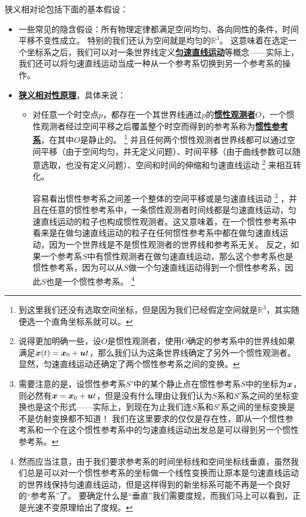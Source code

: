 \documentclass[hyperref, UTF8, a4paper]{ctexart}
\newcommand*{\concept}[1]{\underline{\textbf{#1}}}
\begin{document}
狭义相对论包括下面的基本假设：
\begin{itemize}
    \item 一些常见的隐含假设：所有物理定律都满足空间均匀、各向同性的条件，时间平移不变性成立。
    特别的我们还认为空间就是均匀的$\mathbb{R}^3$。
    这意味着在选定一个坐标系之后，我们可以对一条世界线定义\concept{匀速直线运动}等概念——实际上，我们还可以将匀速直线运动当成一种从一个参考系切换到另一个参考系的操作。
    \item \concept{狭义相对性原理}，具体来说：
    \begin{itemize}
        \item 对任意一个时空点$p$，都存在一个其世界线通过$p$的\concept{惯性观测者}$O$，一个惯性观测者经过空间平移之后覆盖整个时空而得到的参考系称为\concept{惯性参考系}，在其中$O$是静止的。%
        \footnote{
            到这里我们还没有选取空间坐标，但是因为我们已经假定空间就是$\mathbb{R}^3$，其实随便选一个直角坐标系就可以。
        }%
        并且任何两个惯性观测者世界线都可以通过空间平移（由于空间均匀，并无定义问题）、时间平移（由于曲线参数可以随意选取，也没有定义问题）、空间和时间的伸缩和匀速直线运动%
        \footnote{
            说得更加明确一些，设$O$是惯性观测者，使用$O$确定的参考系中的世界线如果满足$\vb*{x}(t) = \vb*{x}_0 + \vb*{u} t$，那么我们认为这条世界线确定了另外一个惯性观测者。
            显然，匀速直线运动还确定了两个惯性参考系之间的变换。
        }%
        来相互转化。
        
        容易看出惯性参考系之间差一个整体的空间平移或是匀速直线运动%
        \footnote{
            需要注意的是，设惯性参考系$S'$中的某个静止点在惯性参考系$S$中的坐标为$\vb*{x}$，则必然有$\vb*{x} = \vb*{x}_0 + \vb*{u} t$，但是没有什么理由让我们认为$S$系和$S'$系之间的坐标变换也是这个形式——实际上，到现在为止我们连$S$系和$S'$系之间的坐标变换是不是仿射变换都不知道！
            我们在这里要求的仅仅是存在性，即从一个惯性参考系和一个在这个惯性参考系中的匀速直线运动出发总是可以得到另一个惯性参考系。
        }%
        ，并且在任意的惯性参考系中，一条惯性观测者时间线都是匀速直线运动，匀速直线运动的粒子也构成惯性观测者。这又意味着，在一个惯性参考系中看来是在做匀速直线运动的粒子在任何惯性参考系中都在做匀速直线运动，因为一个世界线是不是惯性观测者的世界线和参考系无关。
        反之，如果一个参考系$S$中有惯性观测者在做匀速直线运动，那么这个参考系也是惯性参考系，因为可以从$S$做一个匀速直线运动得到一个惯性参考系，因此$S$也是一个惯性参考系。%
        \footnote{
            然而应当注意，由于我们要求参考系的时间坐标线和空间坐标线垂直，虽然我们总是可以对一个惯性参考系的坐标做一个线性变换而让原本是匀速直线运动的世界线保持匀速直线运动，但是这样得到的新坐标系可能不再是一个良好的“参考系”了。
            要确定什么是“垂直”我们需要度规，而我们马上可以看到，正是光速不变原理给出了度规。
        }%


\end{itemize}
\end{itemize}
\end{document}
